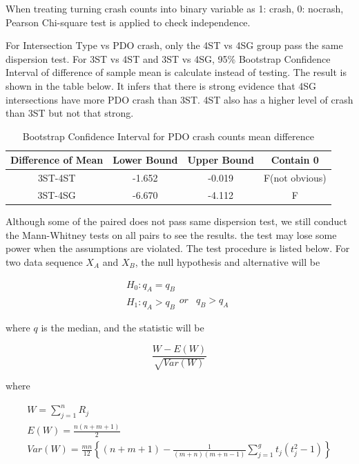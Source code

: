 \documentclass[11pt]{scrartcl} %
\begin{document}
When treating turning crash counts into binary variable as 1: crash, 0: nocrash, Pearson Chi-square test is applied to check independence.

For Intersection Type vs PDO crash, only the 4ST vs 4SG group pass the same dispersion test. For 3ST vs 4ST and 3ST vs 4SG, 95\% Bootstrap Confidence Interval of difference of sample mean is calculate instead of testing. The result is shown in the table below. It infers that there is strong evidence that 4SG intersections have more PDO crash than 3ST. 4ST also has a higher level of crash than 3ST but not that strong.

\begin{table}[H]
\caption{Bootstrap Confidence Interval for PDO crash counts mean difference}
\centering
\begin{tabular}{|c|c|c|c|}
\hline
Difference of Mean  & Lower Bound & Upper Bound & Contain 0 \\
\hline
3ST-4ST & -1.652 & -0.019 & F(not obvious) \\
\hline
3ST-4SG   & -6.670  & -4.112  & F \\
\hline
\end{tabular}
\end{table}

Although some of the paired does not pass same dispersion test, we still conduct the Mann-Whitney tests on all pairs to see the results. the test may lose some power when the assumptions are violated. The test procedure is listed below. For two data sequence ${X_A}$ and ${X_B}$, the null hypothesis and alternative will be

\begin{equation*}
\begin{array}{l}
{H_0}:{q_A} = {q_B}\\
{H_1}:{q_A} > {q_B}\begin{array}{*{20}{c}}
{or}&{{q_B} > {q_A}}
\end{array}
\end{array}
\end{equation*}


where $q$ is the median, and the statistic will be

\begin{equation}
\frac{{W - E\left( W \right)}}{{\sqrt {Var\left( W \right)} }}
\end{equation}

where

\begin{equation}
\label{mw-stat}
\begin{array}{l}
W = \sum\limits_{j = 1}^n {{R_j}} \\
E\left( W \right) = \frac{{n\left( {n + m + 1} \right)}}{2}\\
Var\left( W \right) = \frac{{mn}}{{12}}\left\{ {\left( {n + m + 1} \right) - \frac{1}{{\left( {m + n} \right)\left( {m + n - 1} \right)}}\sum\limits_{j = 1}^g {{t_j}\left( {t_j^2 - 1} \right)} } \right\}
\end{array}
\end{equation}
\end{document}
